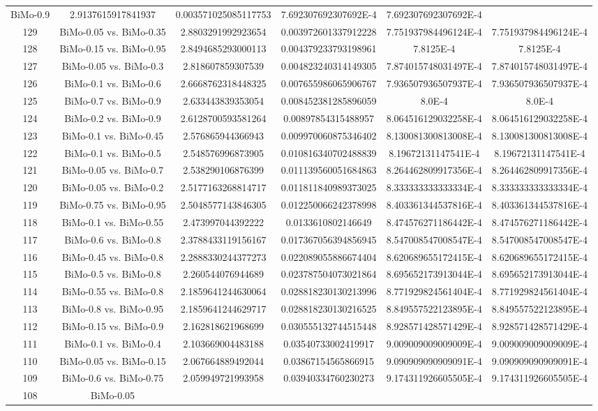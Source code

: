 \documentclass[a4paper,10pt]{article}
\begin{document}
\begin{landscape}
\begin{table}[!htp]
\begin{tabular}{cccccc}
BiMo-0.9&2.9137615917841937&0.003571025085117753&7.692307692307692E-4&7.692307692307692E-4\\129&BiMo-0.05 vs. BiMo-0.35&2.8803291992923654&0.003972601337912228&7.751937984496124E-4&7.751937984496124E-4\\128&BiMo-0.15 vs. BiMo-0.95&2.8494685293000113&0.004379233793198961&7.8125E-4&7.8125E-4\\127&BiMo-0.05 vs. BiMo-0.3&2.818607859307539&0.004823240314149305&7.874015748031497E-4&7.874015748031497E-4\\126&BiMo-0.1 vs. BiMo-0.6&2.6668762318448325&0.007655986065906767&7.936507936507937E-4&7.936507936507937E-4\\125&BiMo-0.7 vs. BiMo-0.9&2.633443839353054&0.008452381285896059&8.0E-4&8.0E-4\\124&BiMo-0.2 vs. BiMo-0.9&2.6128700593581264&0.00897854315488957&8.064516129032258E-4&8.064516129032258E-4\\123&BiMo-0.1 vs. BiMo-0.45&2.576865944366943&0.009970060875346402&8.130081300813008E-4&8.130081300813008E-4\\122&BiMo-0.1 vs. BiMo-0.5&2.548576996873905&0.010816340702488839&8.19672131147541E-4&8.19672131147541E-4\\121&BiMo-0.05 vs. BiMo-0.7&2.538290106876399&0.011139560051684863&8.264462809917356E-4&8.264462809917356E-4\\120&BiMo-0.05 vs. BiMo-0.2&2.5177163268814717&0.011811840989373025&8.333333333333334E-4&8.333333333333334E-4\\119&BiMo-0.75 vs. BiMo-0.95&2.5048577143846305&0.012250066242378998&8.403361344537816E-4&8.403361344537816E-4\\118&BiMo-0.1 vs. BiMo-0.55&2.473997044392222&0.0133610802146649&8.474576271186442E-4&8.474576271186442E-4\\117&BiMo-0.6 vs. BiMo-0.8&2.3788433119156167&0.017367056394856945&8.547008547008547E-4&8.547008547008547E-4\\116&BiMo-0.45 vs. BiMo-0.8&2.2888330244377273&0.022089055886674404&8.620689655172415E-4&8.620689655172415E-4\\115&BiMo-0.5 vs. BiMo-0.8&2.260544076944689&0.023787504073021864&8.695652173913044E-4&8.695652173913044E-4\\114&BiMo-0.55 vs. BiMo-0.8&2.1859641244630064&0.028818230130213996&8.771929824561404E-4&8.771929824561404E-4\\113&BiMo-0.8 vs. BiMo-0.95&2.1859641244629717&0.028818230130216525&8.849557522123895E-4&8.849557522123895E-4\\112&BiMo-0.15 vs. BiMo-0.9&2.162818621968699&0.030555132744515448&8.928571428571429E-4&8.928571428571429E-4\\111&BiMo-0.1 vs. BiMo-0.4&2.103669004483188&0.03540733002419917&9.009009009009009E-4&9.009009009009009E-4\\110&BiMo-0.05 vs. BiMo-0.15&2.067664889492044&0.03867154565866915&9.090909090909091E-4&9.090909090909091E-4\\109&BiMo-0.6 vs. BiMo-0.75&2.059949721993958&0.03940334760230273&9.174311926605505E-4&9.174311926605505E-4\\108&BiMo-0.05 
\end{tabular}
\end{table}
\end{landscape}
\end{document}
